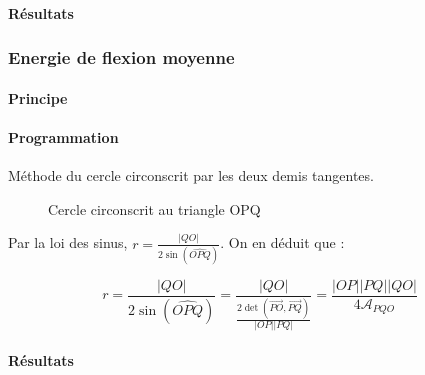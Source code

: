 \documentclass{article}
\begin{document}
	\paragraph{Résultats}
	  

      
      \subsubsection{Energie de flexion moyenne}
      
	\paragraph{Principe}
	
	\paragraph{Programmation}
	
	  Méthode du cercle circonscrit par les deux demis tangentes.
	  
	  \begin{figure}[!h]
	    \centering
	    \caption{Cercle circonscrit au triangle OPQ}
	    \label{cercle-circonscrit}
	  \end{figure}
	  
	  Par la loi des sinus, $r = \frac{|QO|}{2 \sin\left(\widehat{OPQ}\right)}$. On en déduit que :
	  
	  \[ r = \frac{|QO|}{2 \sin\left(\widehat{OPQ}\right)} = \frac{|QO|}{\frac{2 \det\left(\overrightarrow{PO}, \overrightarrow{PQ} \right)}{|OP| |PQ|}} = \frac{|OP| |PQ| |QO|}{4 \mathcal{A}_{PQO}}  \]
	
	\paragraph{Résultats}
    
\end{document}

